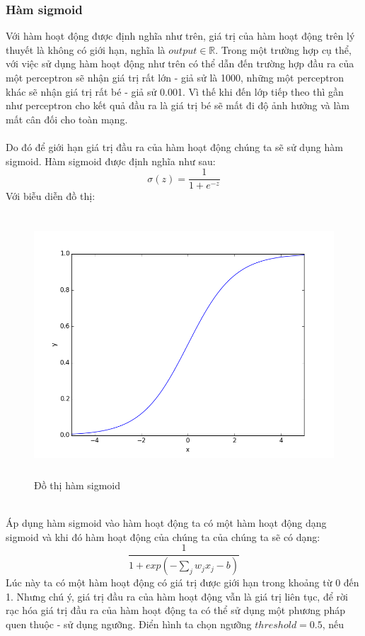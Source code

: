 \subsubsection{Hàm sigmoid}
Với hàm hoạt động được định nghĩa như trên, giá trị của hàm hoạt động trên lý 
thuyết là không có giới hạn, nghĩa là $output\in\mathbb{R}$. Trong một trường 
hợp cụ thể, với việc sử dụng hàm hoạt động như trên có thể dẫn đến trường hợp 
đầu ra của một perceptron sẽ nhận giá trị rất lớn - giả sử là 1000, những một 
perceptron khác sẽ nhận giá trị rất bé - giả sử 0.001. Vì thế khi đến lớp tiếp 
theo thì gần như perceptron cho kết quả đầu ra là giá trị bé sẽ mất đi độ ảnh 
hưởng và làm mất cân đối cho toàn mạng.\\\\
Do đó để giới hạn giá trị đầu ra của hàm hoạt động chúng ta sẽ sử dụng hàm 
sigmoid. Hàm sigmoid được định nghĩa như sau:
\[
  \sigma(z)=\frac{1}{1+e^{-z}}
\]
Với biễu diễn đồ thị:
\begin{figure}[h!]
\centering
\includegraphics[height=3.85in, keepaspectratio=true]{sigmoid.png}
\caption{Đồ thị hàm sigmoid}
\end{figure}\\
Áp dụng hàm sigmoid vào hàm hoạt động ta có một hàm hoạt động dạng sigmoid và 
khi đó hàm hoạt động của chúng ta của chúng ta sẽ có dạng:
\[
  \frac{1}{1+exp(-\sum_j w_j x_j -b)}
\]
Lúc này ta có một hàm hoạt động có giá trị được giới hạn trong khoảng từ 0 đến 
1. Nhưng chú ý, giá trị đầu ra của hàm hoạt động vẫn là giá trị liên tục, để 
rời rạc hóa giá trị đầu ra của hàm hoạt động ta có thể sử dụng một phương pháp 
quen thuộc - sử dụng ngưỡng. Điển hình ta chọn ngưỡng $threshold = 0.5$, nếu 
